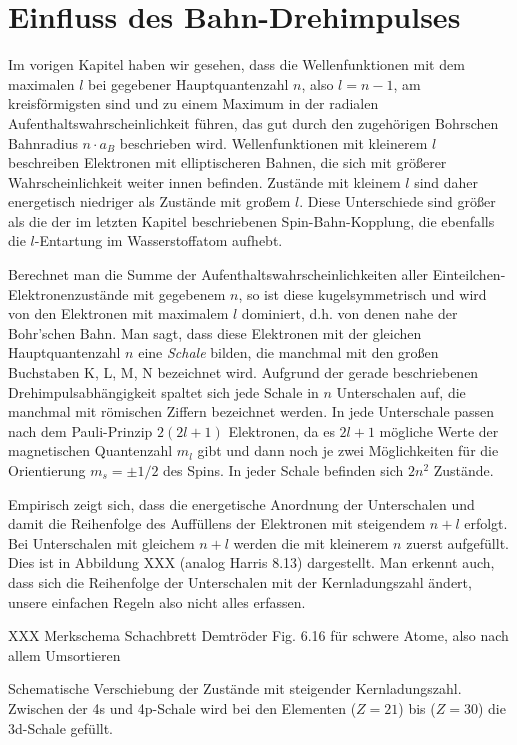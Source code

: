 \section{Einfluss des Bahn-Drehimpulses}

Im vorigen Kapitel haben wir gesehen, dass die Wellenfunktionen mit dem maximalen $l$ bei gegebener Hauptquantenzahl $n$, also $l=n-1$, am kreisförmigsten sind und zu einem Maximum in der radialen Aufenthaltswahrscheinlichkeit führen, das gut durch den zugehörigen Bohrschen Bahnradius $n \cdot a_B$ beschrieben wird. Wellenfunktionen mit kleinerem $l$ beschreiben Elektronen mit elliptischeren Bahnen, die sich mit größerer Wahrscheinlichkeit weiter innen befinden. Zustände mit kleinem $l$ sind daher energetisch niedriger als Zustände mit großem $l$. Diese Unterschiede sind größer als die der im letzten Kapitel beschriebenen Spin-Bahn-Kopplung, die ebenfalls die $l$-Entartung im Wasserstoffatom aufhebt.

Berechnet man die Summe der Aufenthaltswahrscheinlichkeiten aller Einteilchen-Elektronenzustände mit gegebenem $n$, so ist diese kugelsymmetrisch und wird von den Elektronen mit maximalem $l$ dominiert, d.h. von denen nahe  der Bohr'schen Bahn. 
Man sagt, dass diese Elektronen mit der gleichen Hauptquantenzahl $n$ eine \emph{Schale} bilden, die manchmal mit den großen Buchstaben K, L, M, N bezeichnet wird.  Aufgrund der gerade beschriebenen Drehimpulsabhängigkeit spaltet sich jede Schale in $n$ Unterschalen auf, die manchmal mit römischen Ziffern bezeichnet werden. In jede Unterschale passen nach dem Pauli-Prinzip $2 (2l +1)$ Elektronen, da es $2l +1$ mögliche Werte der magnetischen Quantenzahl $m_l$ gibt und dann noch je zwei Möglichkeiten für die Orientierung $m_s = \pm 1/2$ des Spins. In jeder Schale befinden sich $2n^2$ Zustände.

Empirisch zeigt sich, dass die energetische Anordnung der Unterschalen und damit die Reihenfolge des Auffüllens der Elektronen mit steigendem $n+l$ erfolgt. Bei Unterschalen mit gleichem $n+l$ werden die mit kleinerem $n$ zuerst aufgefüllt. Dies ist in Abbildung XXX (analog Harris 8.13) dargestellt. Man erkennt auch, dass sich die Reihenfolge der Unterschalen mit der Kernladungszahl ändert, unsere einfachen Regeln also nicht alles erfassen.

XXX Merkschema Schachbrett Demtröder Fig. 6.16 für schwere Atome, also nach allem Umsortieren

\begin{marginfigure}
    \caption{Schematische Verschiebung der Zustände mit steigender Kernladungszahl. Zwischen der 4s und 4p-Schale wird bei den Elementen   ($Z=21$) bis  ($Z=30$) die 3d-Schale gefüllt.}
\end{marginfigure}

